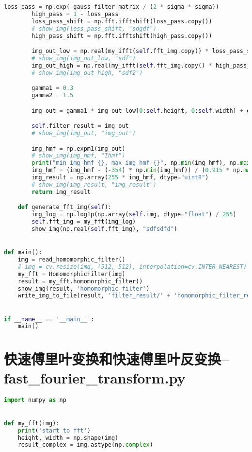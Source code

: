 \documentclass{hitreport}
\begin{document}
\begin{appendices}
\begin{lstlisting}[language=python]
        loss_pass = np.exp(-gauss_filter_matrix / (2 * sigma * sigma))
        high_pass = 1 - loss_pass
        loss_pass_shift = np.fft.ifftshift(loss_pass.copy())
        # show_img(loss_pass_shift, "sdgdf")
        high_pass_shift = np.fft.ifftshift(high_pass.copy())

        img_out_low = np.real(my_ifft(self.fft_img.copy() * loss_pass_shift))
        # show_img(img_out_low, "sdf")
        img_out_high = np.real(my_ifft(self.fft_img.copy() * high_pass_shift))
        # show_img(img_out_high, "sdf2")

        gamma1 = 0.3
        gamma2 = 1.5

        img_out = gamma1 * img_out_low[0:self.height, 0:self.width] + gamma2 * img_out_high[0:self.height, 0:self.width]

        self.filter_result = img_out
        # show_img(img_out, "img_out")

        img_hmf = np.expm1(img_out)
        # show_img(img_hmf, "Ihmf")
        print("min img_hmf {}, max img_hmf {}", np.min(img_hmf), np.max(img_hmf))
        img_hmf = (img_hmf - (-354) * np.min(img_hmf)) / (0.915 * np.max(img_hmf) - (-354) * np.min(img_hmf))
        img_result = np.array(255 * img_hmf, dtype="uint8")
        # show_img(img_result, "img_result")
        return img_result

    def generate_fft_img(self):
        img_log = np.log1p(np.array(self.img, dtype="float") / 255)
        self.fft_img = my_fft(img_log)
        show_img(np.real(self.fft_img), "sdfsdfd")


def main():
    img = read_homomorphic_filter()
    # img = cv.resize(img, (512, 512), interpolation=cv.INTER_NEAREST)
    my_fft = HomomorphicFilter(img)
    result = my_fft.homomorphic_filter()
    show_img(result, 'homomorphic filter')
    write_img_to_file(result, 'filter_result/' + 'homomorphic_filter_result')


if __name__ == '__main__':
    main()

\end{lstlisting}

\section{快速傅里叶变换和快速傅里叶反变换--fast\_fourier\_transform.py}\label{app:fft}
\begin{lstlisting}[language=python]
import numpy as np


def my_fft(img):
    print('start to fft')
    height, width = np.shape(img)
    result_complex = img.astype(np.complex)


\end{lstlisting}
\end{appendices}
\end{document}
